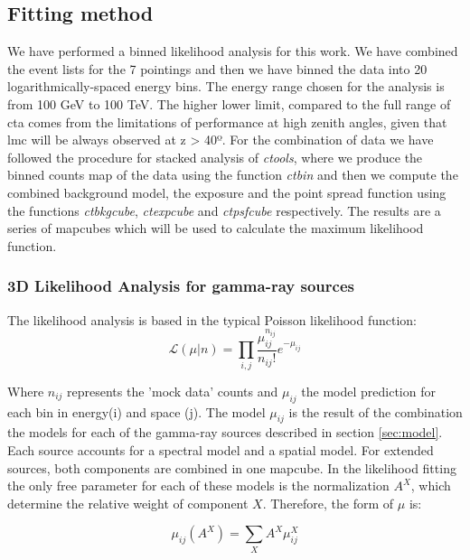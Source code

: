 \documentclass[main.tex]{subfiles}
\begin{document}
    \subsection{Fitting method}

    We have performed a binned likelihood analysis for this work. We have combined the event lists for the 7 pointings and then we have binned the data into 20 logarithmically-spaced energy bins. The energy range chosen for the analysis is from 100 GeV to 100 TeV. The higher lower limit, compared to the full range of \gls{cta} comes from the limitations of performance at high zenith angles, given that \gls{lmc} will be always observed at z > 40º.
    For the combination of data we have followed the procedure for stacked analysis of \textit{ctools}, where we produce the binned counts map of the data using the function \textit{ctbin} and then we compute the combined background model, the exposure and the point spread function using the functions \textit{ctbkgcube}, \textit{ctexpcube} and \textit{ctpsfcube} respectively. The results are a series of mapcubes which will be used to calculate the maximum likelihood function.

    \subsubsection{3D Likelihood Analysis for gamma-ray sources}

    The likelihood analysis is based in the typical Poisson likelihood function:
    \begin{equation}
      \mathcal{L}(\mu | n) = \prod_{i,j}\frac{\mu_{ij}^{n_{ij}}}{n_{ij}!}e^{-\mu_{ij}}
      \label{eq:likelihood}
    \end{equation}

    Where $n_{ij}$ represents the 'mock data' counts and $\mu_{ij}$ the model prediction for each bin in energy(i) and space (j). The model $\mu_{ij}$ is the result of the combination the models for each of the gamma-ray sources described in section \ref{sec:model}. Each source accounts for a spectral model and a spatial model. For extended sources, both components are combined in one mapcube. In the likelihood fitting the only free parameter for each of these models is the normalization $A^{X}$, which determine the relative weight of component $X$. Therefore, the form of $\mu$ is:

    \begin{equation}
      \mu_{ij}(A^{X}) = \sum_{X} A^{X} \mu^{X}_{ij}
    \end{equation}
\end{document}
